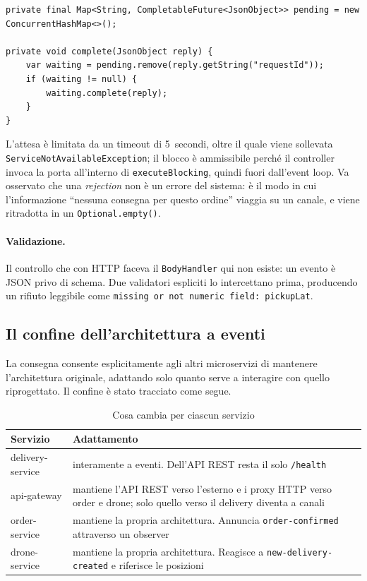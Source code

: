 \documentclass[12pt,a4paper]{article}
\begin{document}
\begin{lstlisting}[caption={Correlazione richiesta-risposta nell'api-gateway}]
private final Map<String, CompletableFuture<JsonObject>> pending = new ConcurrentHashMap<>();

private void complete(JsonObject reply) {
    var waiting = pending.remove(reply.getString("requestId"));
    if (waiting != null) {
        waiting.complete(reply);
    }
}
\end{lstlisting}

L'attesa \`e limitata da un timeout di 5~secondi, oltre il quale viene sollevata
\texttt{ServiceNotAvailableException}; il blocco \`e ammissibile perch\'e il controller invoca la
porta all'interno di \texttt{executeBlocking}, quindi fuori dall'event loop. Va osservato che una
\emph{rejection} non \`e un errore del sistema: \`e il modo in cui l'informazione ``nessuna consegna
per questo ordine'' viaggia su un canale, e viene ritradotta in un \texttt{Optional.empty()}.

\paragraph{Validazione.} Il controllo che con HTTP faceva il \texttt{BodyHandler} qui non esiste:
un evento \`e JSON privo di schema. Due validatori espliciti lo intercettano prima, producendo un rifiuto
leggibile come \texttt{missing or not numeric field: pickupLat}.

\subsection{Il confine dell'architettura a eventi}

La consegna consente esplicitamente agli altri microservizi di mantenere l'architettura originale,
adattando solo quanto serve a interagire con quello riprogettato. Il confine \`e stato tracciato
come segue.

\begin{table}[H]
\centering
\caption{Cosa cambia per ciascun servizio}
\begin{tabularx}{\textwidth}{lX}
\toprule
\textbf{Servizio} & \textbf{Adattamento} \\
\midrule
delivery-service & interamente a eventi. Dell'API REST resta il solo \texttt{/health}\\
api-gateway & mantiene l'API REST verso l'esterno e i proxy HTTP verso order e drone; solo quello verso il delivery diventa a canali \\
order-service & mantiene la propria architettura. Annuncia \texttt{order-confirmed} attraverso un observer \\
drone-service & mantiene la propria architettura. Reagisce a \texttt{new-delivery-created} e riferisce le posizioni \\
\bottomrule
\end{tabularx}
\end{table}
\end{document}

